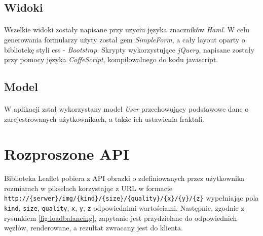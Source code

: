 \documentclass[wide,a4paper,titlepage,12pt]{article}
\begin{document}
\subsection{Widoki}
\paragraph{}
Wszelkie widoki zostały napisane przy uzyciu języka znaczników \textit{Haml}. W celu generowania 
formularzy użyty został gem \textit{SimpleForm}, a cały layout oparty o bibliotekę styli 
css - \textit{Bootstrap}. Skrypty wykorzystujące \textit{jQuery}, napisane zostały przy pomocy 
języka \textit{CoffeScript}, kompilowalnego do kodu javascript.

\subsection{Model}
\paragraph{}
W aplikacji zstał wykorzystany model \textit{User} przechowujący podstawowe dane o zarejestrowanych użytkownikach,
a także ich ustawienia fraktali.

\section{Rozproszone API}
\paragraph{}
Biblioteka Leaflet pobiera z API obrazki o zdefiniowanych przez użytkownika rozmiarach w pikselach
korzystając z URL w formacie \newline
 \texttt{http://\{serwer\}/img/\{kind\}/\{size\}/\{quality\}/\{x\}/\{y\}/\{z\}}
wypełniając pola \texttt{kind}, \texttt{size}, \texttt{quality}, \texttt{x}, \texttt{y}, \texttt{z} odpowiednimi
wartościami. Następnie, zgodnie z rysunkiem \ref{fig:loadbalancing}, zapytanie
jest przydzielane do odpowiednich węzłów, renderowane, a rezultat
zwracany jest do klienta.
\end{document}
